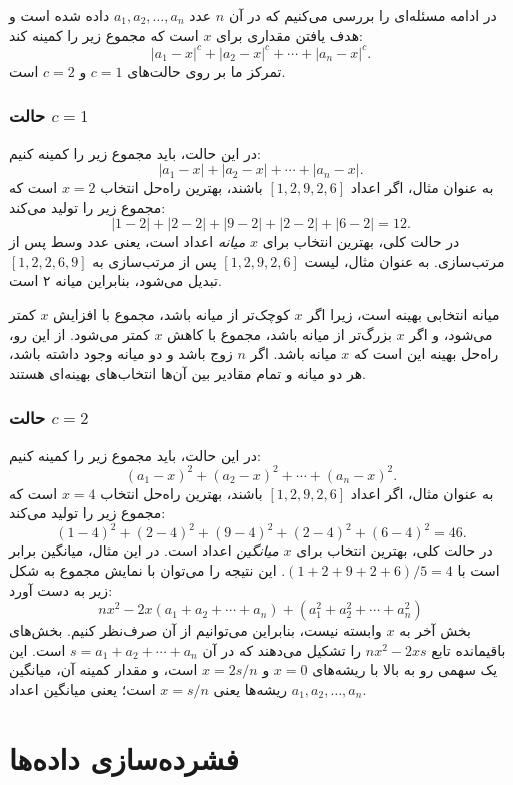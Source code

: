 در ادامه مسئله‌ای را بررسی می‌کنیم که در آن $n$ عدد $a_1,a_2,\ldots,a_n$ داده شده است و هدف یافتن مقداری برای $x$ است که مجموع زیر را کمینه کند:
\[|a_1-x|^c+|a_2-x|^c+\cdots+|a_n-x|^c.\]
تمرکز ما بر روی حالت‌های $c=1$ و $c=2$ است.

\subsubsection{حالت $c=1$}

در این حالت، باید مجموع زیر را کمینه کنیم:
\[|a_1-x|+|a_2-x|+\cdots+|a_n-x|.\]
به عنوان مثال، اگر اعداد $[1,2,9,2,6]$ باشند،
بهترین راه‌حل انتخاب $x=2$ است
که مجموع زیر را تولید می‌کند:
\[
|1-2|+|2-2|+|9-2|+|2-2|+|6-2|=12.
\]
در حالت کلی، بهترین انتخاب برای $x$
\textit{میانه} اعداد است،
یعنی عدد وسط پس از مرتب‌سازی.
به عنوان مثال، لیست $[1,2,9,2,6]$
پس از مرتب‌سازی به $[1,2,2,6,9]$ تبدیل می‌شود،
بنابراین میانه ۲ است.

میانه انتخابی بهینه است،
زیرا اگر $x$ کوچک‌تر از میانه باشد،
مجموع با افزایش $x$ کمتر می‌شود،
و اگر $x$ بزرگ‌تر از میانه باشد،
مجموع با کاهش $x$ کمتر می‌شود.
از این رو، راه‌حل بهینه این است که $x$
میانه باشد.
اگر $n$ زوج باشد و دو میانه وجود داشته باشد،
هر دو میانه و تمام مقادیر بین آن‌ها
انتخاب‌های بهینه‌ای هستند.

\subsubsection{حالت $c=2$}

در این حالت، باید مجموع زیر را کمینه کنیم:
\[(a_1-x)^2+(a_2-x)^2+\cdots+(a_n-x)^2.\]
به عنوان مثال، اگر اعداد $[1,2,9,2,6]$ باشند،
بهترین راه‌حل انتخاب $x=4$ است
که مجموع زیر را تولید می‌کند:
\[
(1-4)^2+(2-4)^2+(9-4)^2+(2-4)^2+(6-4)^2=46.
\]
در حالت کلی، بهترین انتخاب برای $x$
\emph{میانگین} اعداد است.
در این مثال، میانگین برابر است با $(1+2+9+2+6)/5=4$.
این نتیجه را می‌توان با نمایش مجموع
به شکل زیر به دست آورد:
\[
nx^2 - 2x(a_1+a_2+\cdots+a_n) + (a_1^2+a_2^2+\cdots+a_n^2)
\]
بخش آخر به $x$ وابسته نیست،
بنابراین می‌توانیم از آن صرف‌نظر کنیم.
بخش‌های باقیمانده تابع
$nx^2-2xs$ را تشکیل می‌دهند که در آن $s=a_1+a_2+\cdots+a_n$ است.
این یک سهمی رو به بالا
با ریشه‌های $x=0$ و $x=2s/n$ است،
و مقدار کمینه آن، میانگین ریشه‌ها
یعنی $x=s/n$ است؛ یعنی
میانگین اعداد $a_1,a_2,\ldots,a_n$.

\section{فشرده‌سازی داده‌ها}

